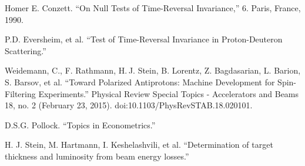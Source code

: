 \documentclass[reprint, superscriptaddress]{revtex4-1}
\begin{document}
\begin{thebibliography}{9}
Homer E. Conzett. ``On Null Tests of Time-Reversal Invariance,'' 6. Paris, France, 1990. %

P.D. Eversheim, et al. ``Test of Time-Reversal Invariance in Proton-Deuteron Scattering.''

Weidemann, C., F. Rathmann, H. J. Stein, B. Lorentz, Z. Bagdasarian, L. Barion, S. Barsov, et al. ``Toward Polarized Antiprotons: Machine Development for Spin-Filtering Experiments.'' Physical Review Special Topics - Accelerators and Beams 18, no. 2 (February 23, 2015). doi:10.1103/PhysRevSTAB.18.020101.

D.S.G. Pollock. ``Topics in Econometrics.'' %

H. J. Stein, M. Hartmann, I. Keshelashvili, et al. ``Determination of target thickness and luminosity from beam energy losses.''

\end{thebibliography}
\end{document}
